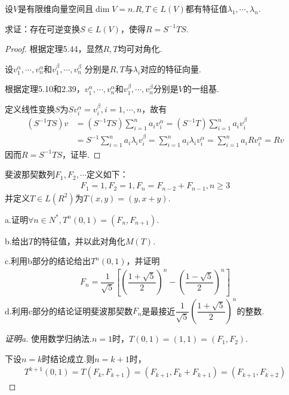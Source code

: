 \begin{problem}[12]\label{5.C.12}
    设\(V\)是有限维向量空间且\(\dim V=n\).\(R,T \in L(V)\)都有特征值\(\lambda_1,\cdots,\lambda_n\).

    求证：存在可逆变换\(S \in L(V)\)，使得\(R=S^{-1}TS\).
\end{problem}

\begin{proof}
    根据定理5.44，显然\(R,T\)均可对角化.

    设\(v_1^\alpha,\cdots,v_n^\alpha\)和\(v_1^\beta,\cdots,v_n^\beta\)
    分别是\(R,T\)与\(\lambda_i\)对应的特征向量.
    
    根据定理5.10和2.39，\(v_1^\alpha,\cdots,v_n^\alpha\)和\(v_1^\beta,\cdots,v_n^\beta\)分别是\(V\)的一组基.
    
    定义线性变换\(S\)为\(Sv_i^\alpha=v_i^\beta,i=1,\cdots,n\)，故有
    \begin{align*}
        (S^{-1}TS)v &=(S^{-1}TS)\sum_{i=1}^n a_iv_i^\alpha=(S^{-1}T)\sum_{i=1}^n a_iv_i^\beta \\
                    &=S^{-1}\sum_{i=1}^n a_i\lambda_i v_i^\beta=\sum_{i=1}^n a_i\lambda_i v_i^\alpha
                        =\sum_{i=1}^n a_iRv_i^\alpha=Rv
    \end{align*}
    因而\(R=S^{-1}TS\)，证毕.
\end{proof}

\newpage

\begin{problem}[16]\label{5.C.16}
    斐波那契数列\(F_1,F_2,\cdots\)定义如下：
    \begin{align*}
        F_1=1,F_2=1,F_n=F_{n-2}+F_{n-1},n \geq 3
    \end{align*}
    并定义\(T \in L(R^2)\)为\(T(x,y)=(y,x+y)\).

    a.证明\(\forall n \in N^*,T^n(0,1)=(F_n,F_{n+1})\).

    b.给出\(T\)的特征值，并以此对角化\(M(T)\).
    
    c.利用b部分的结论给出\(T^n(0,1)\)，并证明
    \begin{align*}
        F_n=\dfrac{1}{\sqrt{5}}[(\dfrac{1+\sqrt{5}}{2})^n-(\dfrac{1-\sqrt{5}}{2})^n]
    \end{align*}
    d.利用c部分的结论证明{\kaishu 斐波那契数}\(F_n\)是最接近\(\dfrac{1}{\sqrt{5}}(\dfrac{1+\sqrt{5}}{2})^n\)的整数.
\end{problem}

\begin{proof}[证明a]
    使用数学归纳法.\(n=1\)时，\(T(0,1)=(1,1)=(F_1,F_2)\).

    下设\(n=k\)时结论成立.则\(n=k+1\)时，
    \begin{align*}
        T^{k+1}(0,1)=T(F_k,F_{k+1})=(F_{k+1},F_k+F_{k+1})=(F_{k+1},F_{k+2})
    \end{align*}
\end{proof}

